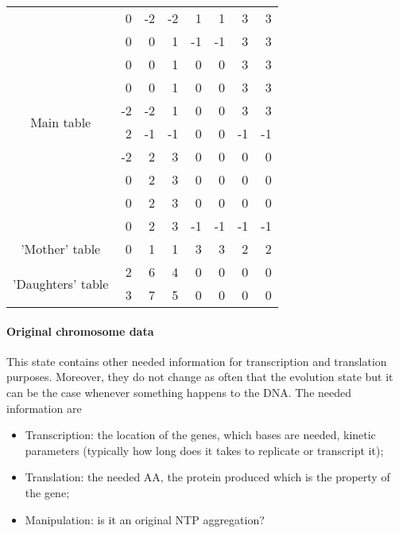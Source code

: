 \begin{center}
  \begin{tabular}{|c|r|r|r|r|r|r|r|}
     \hline
     \multirow{10}{*}{Main table} & 0 & -2 & -2 &  1 &  1 & 3 & 3 \\
     &  0 &  0 &  1 & -1 & -1 &  3 &  3 \\
     &  0 &  0 &  1 &  0 &  0 &  3 &  3 \\
     &  0 &  0 &  1 &  0 &  0 &  3 &  3 \\
     & -2 & -2 &  1 &  0 &  0 &  3 &  3 \\
     &  2 & -1 & -1 &  0 &  0 & -1 & -1 \\
     & -2 &  2 &  3 &  0 &  0 &  0 &  0 \\
     &  0 &  2 &  3 &  0 &  0 &  0 &  0 \\
     &  0 &  2 &  3 &  0 &  0 &  0 &  0 \\
     &  0 &  2 &  3 & -1 & -1 & -1 & -1 \\
     \hline \hline
     'Mother' table & 0 & 1 & 1 & 3 & 3 & 2 & 2 \\
     \hline \hline
     \multirow{2}{*}{'Daughters' table} & 2 & 6 & 4 & 0 & 0 & 0 & 0 \\
     & 3 & 7 & 5 & 0 & 0 & 0 & 0 \\
     \hline
   \end{tabular}
\end{center}


\paragraph{Original chromosome data} This state contains other needed information for transcription and translation purposes. Moreover, they do not change as often that the evolution state but it can be the case whenever something happens to the DNA. The needed information are
\begin{itemize}
  \item Transcription: the location of the genes, which bases are needed, \textcolor[rgb]{1.00,0.00,0.00}{kinetic parameters (typically how long does it takes to replicate or transcript it)};
  \item Translation: the needed AA, \textcolor[rgb]{1.00,0.00,0.00}{the protein produced which is the property of the gene};
  \item \textcolor[rgb]{1.00,0.00,0.00}{Manipulation: is it an original NTP aggregation?}
\end{itemize}


